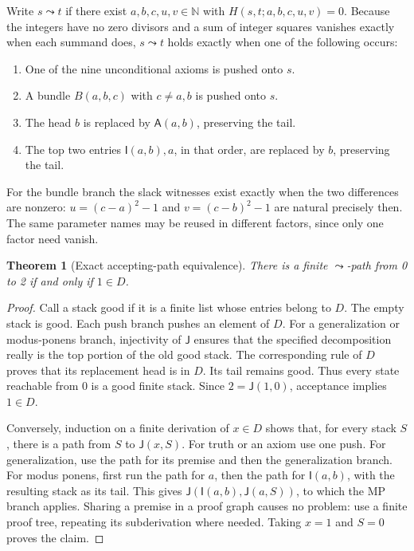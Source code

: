 \documentclass[11pt]{article}
\newcommand{\N}{\mathbb N}
\newcommand{\Imp}{\mathsf I}
\newcommand{\All}{\mathsf A}
\newcommand{\J}{\mathsf J}
\newtheorem{theorem}{Theorem}
\begin{document}
Write \(s\leadsto t\) if there exist \(a,b,c,u,v\in\N\) with
\(H(s,t;a,b,c,u,v)=0\). Because the integers have no zero divisors and
a sum of integer squares vanishes exactly when each summand does,
\(s\leadsto t\) holds exactly when one of the following occurs:
\begin{enumerate}
 \item One of the nine unconditional axioms is pushed onto \(s\).
 \item A bundle \(B(a,b,c)\) with \(c\ne a,b\) is pushed onto \(s\).
 \item The head \(b\) is replaced by \(\All(a,b)\), preserving the tail.
 \item The top two entries \(\Imp(a,b),a\), in that order, are replaced
       by \(b\), preserving the tail.
\end{enumerate}
For the bundle branch the slack witnesses exist exactly when the two
differences are nonzero: \(u=(c-a)^2-1\) and \(v=(c-b)^2-1\) are natural
precisely then. The same parameter names may be reused in different
factors, since only one factor need vanish.

\begin{theorem}[Exact accepting-path equivalence]
There is a finite \(\leadsto\)-path from 0 to 2 if and only if \(1\in D\).
\end{theorem}
\begin{proof}
Call a stack good if it is a finite list whose entries belong to \(D\).
The empty stack is good. Each push branch pushes an element of \(D\).
For a generalization or modus-ponens branch, injectivity of \(\J\)
ensures that the specified decomposition really is the top portion of
the old good stack. The corresponding rule of \(D\) proves that its
replacement head is in \(D\). Its tail remains good. Thus every state
reachable from 0 is a good finite stack. Since
\(2=\J(1,0)\), acceptance implies \(1\in D\).

Conversely, induction on a finite derivation of \(x\in D\) shows that,
for every stack \(S\), there is a path from \(S\) to \(\J(x,S)\).
For truth or an axiom use one push. For generalization, use the path
for its premise and then the generalization branch. For modus ponens,
first run the path for \(a\), then the path for \(\Imp(a,b)\), with
the resulting stack as its tail. This gives
\(\J(\Imp(a,b),\J(a,S))\), to which the MP branch applies.
Sharing a premise in a proof graph causes no problem: use a finite
proof tree, repeating its subderivation where needed. Taking \(x=1\)
and \(S=0\) proves the claim.
\end{proof}
\end{document}
